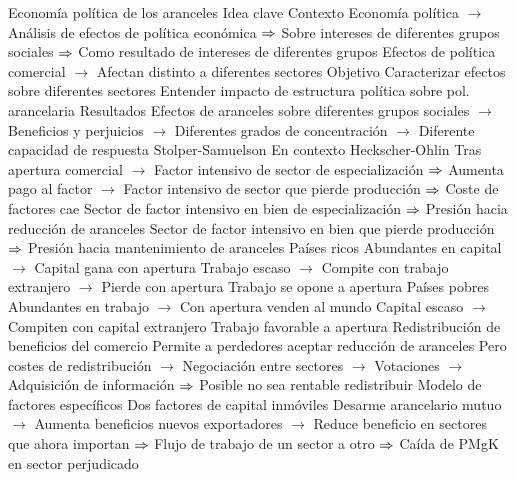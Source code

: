 \documentclass{nuevotema}
\begin{document}
\begin{esquemal}
		\2 Economía política de los aranceles
			\3 Idea clave
				\4 Contexto
				\4[] Economía política
				\4[] $\to$ Análisis de efectos de política económica
				\4[] $\then$ Sobre intereses de diferentes grupos sociales
				\4[] $\then$ Como resultado de intereses de diferentes grupos
				\4[] Efectos de política comercial
				\4[] $\to$ Afectan distinto a diferentes sectores
				\4 Objetivo
				\4[] Caracterizar efectos sobre diferentes sectores
				\4[] Entender impacto de estructura política sobre pol. arancelaria
				\4 Resultados
				\4[] Efectos de aranceles sobre diferentes grupos sociales
				\4[] $\to$ Beneficios y perjuicios
				\4[] $\to$ Diferentes grados de concentración
				\4[] $\to$ Diferente capacidad de respuesta
			\3 Stolper-Samuelson
				\4 En contexto Heckscher-Ohlin
				\4 Tras apertura comercial
				\4[] $\to$ Factor intensivo de sector de especialización
				\4[] $\then$ Aumenta pago al factor
				\4[] $\to$ Factor intensivo de sector que pierde producción
				\4[] $\then$ Coste de factores cae
				\4 Sector de factor intensivo en bien de especialización
				\4[] $\then$ Presión hacia reducción de aranceles
				\4 Sector de factor intensivo en bien que pierde producción
				\4[] $\then$ Presión hacia mantenimiento de aranceles
				\4 Países ricos
				\4[] Abundantes en capital
				\4[] $\to$ Capital gana con apertura
				\4[] Trabajo escaso
				\4[] $\to$ Compite con trabajo extranjero
				\4[] $\to$ Pierde con apertura
				\4[$\then$] Trabajo se opone a apertura
				\4 Países pobres
				\4[] Abundantes en trabajo
				\4[] $\to$ Con apertura venden al mundo
				\4[] Capital escaso
				\4[] $\to$ Compiten con capital extranjero
				\4[$\then$] Trabajo favorable a apertura
			\3 Redistribución de beneficios del comercio
				\4 Permite a perdedores aceptar reducción de aranceles
				\4 Pero costes de redistribución
				\4[] $\to$ Negociación entre sectores
				\4[] $\to$ Votaciones
				\4[] $\to$ Adquisición de información
				\4[] $\then$ Posible no sea rentable redistribuir
			\3 Modelo de factores específicos
				\4 Dos factores de capital inmóviles
				\4 Desarme arancelario mutuo
				\4[] $\to$ Aumenta beneficios nuevos exportadores
				\4[] $\to$ Reduce beneficio en sectores que ahora importan
				\4[] $\then$ Flujo de trabajo de un sector a otro
				\4[] $\then$ Caída de PMgK en sector perjudicado

\end{esquemal}
\end{document}
